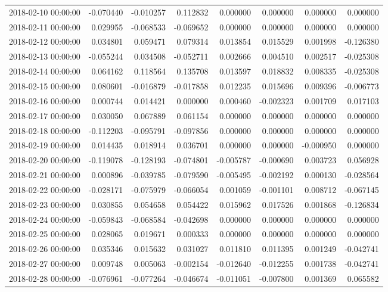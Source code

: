 \begin{tabular}{lrrrrrrr}
2018-02-10 00:00:00 & -0.070440 & -0.010257 & 0.112832 & 0.000000 & 0.000000 & 0.000000 & 0.000000 \\
2018-02-11 00:00:00 & 0.029955 & -0.068533 & -0.069652 & 0.000000 & 0.000000 & 0.000000 & 0.000000 \\
2018-02-12 00:00:00 & 0.034801 & 0.059471 & 0.079314 & 0.013854 & 0.015529 & 0.001998 & -0.126380 \\
2018-02-13 00:00:00 & -0.055244 & 0.034508 & -0.052711 & 0.002666 & 0.004510 & 0.002517 & -0.025308 \\
2018-02-14 00:00:00 & 0.064162 & 0.118564 & 0.135708 & 0.013597 & 0.018832 & 0.008335 & -0.025308 \\
2018-02-15 00:00:00 & 0.080601 & -0.016879 & -0.017858 & 0.012235 & 0.015696 & 0.009396 & -0.006773 \\
2018-02-16 00:00:00 & 0.000744 & 0.014421 & 0.000000 & 0.000460 & -0.002323 & 0.001709 & 0.017103 \\
2018-02-17 00:00:00 & 0.030050 & 0.067889 & 0.061154 & 0.000000 & 0.000000 & 0.000000 & 0.000000 \\
2018-02-18 00:00:00 & -0.112203 & -0.095791 & -0.097856 & 0.000000 & 0.000000 & 0.000000 & 0.000000 \\
2018-02-19 00:00:00 & 0.014435 & 0.018914 & 0.036701 & 0.000000 & 0.000000 & -0.000950 & 0.000000 \\
2018-02-20 00:00:00 & -0.119078 & -0.128193 & -0.074801 & -0.005787 & -0.000690 & 0.003723 & 0.056928 \\
2018-02-21 00:00:00 & 0.000896 & -0.039785 & -0.079590 & -0.005495 & -0.002192 & 0.000130 & -0.028564 \\
2018-02-22 00:00:00 & -0.028171 & -0.075979 & -0.066054 & 0.001059 & -0.001101 & 0.008712 & -0.067145 \\
2018-02-23 00:00:00 & 0.030855 & 0.054658 & 0.054422 & 0.015962 & 0.017526 & 0.001868 & -0.126834 \\
2018-02-24 00:00:00 & -0.059843 & -0.068584 & -0.042698 & 0.000000 & 0.000000 & 0.000000 & 0.000000 \\
2018-02-25 00:00:00 & 0.028065 & 0.019671 & 0.000333 & 0.000000 & 0.000000 & 0.000000 & 0.000000 \\
2018-02-26 00:00:00 & 0.035346 & 0.015632 & 0.031027 & 0.011810 & 0.011395 & 0.001249 & -0.042741 \\
2018-02-27 00:00:00 & 0.009748 & 0.005063 & -0.002154 & -0.012640 & -0.012255 & 0.001738 & -0.042741 \\
2018-02-28 00:00:00 & -0.076961 & -0.077264 & -0.046674 & -0.011051 & -0.007800 & 0.001369 & 0.065582 \\

\end{tabular}
